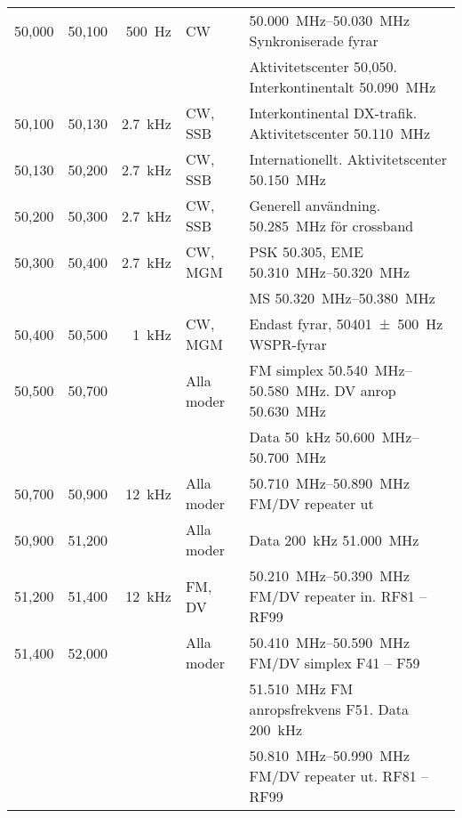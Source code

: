 \begin{tabular}{rrrll}
50,000 & 50,100 & \qty{500}{\hertz}      & CW           & \SIrange{50,000}{50,030}{\mega\hertz} Synkroniserade fyrar \\
       &        &                        &              & Aktivitetscenter 50,050. Interkontinentalt \qty{50,090}{\mega\hertz}  \\ \hline
50,100 & 50,130 & \qty{2,7}{\kilo\hertz} & CW, SSB      & Interkontinental DX-trafik. Aktivitetscenter \qty{50,110}{\mega\hertz} \\ \hline
50,130 & 50,200 & \qty{2,7}{\kilo\hertz} & CW, SSB      & Internationellt. Aktivitetscenter \qty{50,150}{\mega\hertz} \\ \hline
50,200 & 50,300 & \qty{2,7}{\kilo\hertz} & CW, SSB      & Generell användning. \qty{50,285}{\mega\hertz} för crossband        \\ \hline
50,300 & 50,400 & \qty{2,7}{\kilo\hertz} & CW, MGM     & PSK \num{50,305}, EME \SIrange{50,310}{50,320}{\mega\hertz}     \\
       &        &         &             & MS \SIrange{50,320}{50,380}{\mega\hertz}                        \\ \hline
50,400 & 50,500 & \qty{1}{\kilo\hertz}   & CW, MGM     & Endast fyrar, \qty{50401(500)}{\hertz} WSPR-fyrar               \\ \hline
50,500 & 50,700 &         & Alla moder  & FM simplex \SIrange{50,540}{50,580}{\mega\hertz}. DV anrop  \qty{50,630}{\mega\hertz}                \\
       &        &         &             & Data \qty{50}{\kilo\hertz} \SIrange{50,600}{50,700}{\mega\hertz} \\ \hline
50,700 & 50,900 & \qty{12}{\kilo\hertz}  & Alla moder  & \SIrange{50,710}{50,890}{\mega\hertz} FM/DV repeater ut \\ \hline
50,900 & 51,200 &         & Alla moder  & Data \qty{200}{\kilo\hertz} \qty{51,000}{\mega\hertz} \\ \hline
51,200 & 51,400 & \qty{12}{\kilo\hertz}  & FM, DV      & \SIrange{50,210}{50,390}{\mega\hertz} FM/DV repeater in. RF81 -- RF99 \\ \hline
51,400 & 52,000 &         & Alla moder  & \SIrange{50,410}{50,590}{\mega\hertz} FM/DV simplex F41 -- F59 \\
       &        &         &             & \qty{51,510}{\mega\hertz} FM anropsfrekvens F51. Data \qty{200}{\kilo\hertz} \\
       &        &         &             & \SIrange{50,810}{50,990}{\mega\hertz} FM/DV repeater ut. RF81 -- RF99 \\
\end{tabular}


